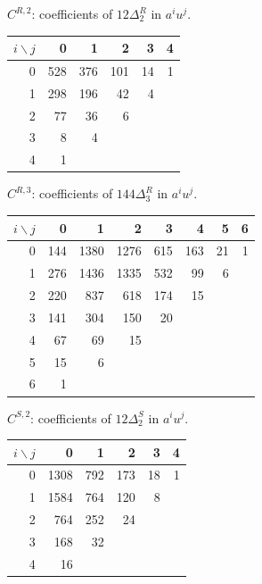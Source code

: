 \begin{center}
\begin{minipage}{\textwidth}
\centering\small
$C^{R,2}$: coefficients of $12\Delta^{R}_{2}$ in $a^i u^j$.\par\smallskip
\setlength{\tabcolsep}{5pt}
\renewcommand{\arraystretch}{1.12}
\begin{tabular}{r|rrrrr}
$i\backslash j$ & 0 & 1 & 2 & 3 & 4 \\
\hline
0 & 528 & 376 & 101 & 14 & 1 \\
1 & 298 & 196 & 42 & 4 &  \\
2 & 77 & 36 & 6 &  &  \\
3 & 8 & 4 &  &  &  \\
4 & 1 &  &  &  &  \\
\end{tabular}
\end{minipage}
\end{center}
\begin{center}
\begin{minipage}{\textwidth}
\centering\small
$C^{R,3}$: coefficients of $144\Delta^{R}_{3}$ in $a^i u^j$.\par\smallskip
\setlength{\tabcolsep}{5pt}
\renewcommand{\arraystretch}{1.12}
\begin{tabular}{r|rrrrrrr}
$i\backslash j$ & 0 & 1 & 2 & 3 & 4 & 5 & 6 \\
\hline
0 & 144 & 1380 & 1276 & 615 & 163 & 21 & 1 \\
1 & 276 & 1436 & 1335 & 532 & 99 & 6 &  \\
2 & 220 & 837 & 618 & 174 & 15 &  &  \\
3 & 141 & 304 & 150 & 20 &  &  &  \\
4 & 67 & 69 & 15 &  &  &  &  \\
5 & 15 & 6 &  &  &  &  &  \\
6 & 1 &  &  &  &  &  &  \\
\end{tabular}
\end{minipage}
\end{center}
\begin{center}
\begin{minipage}{\textwidth}
\centering\small
$C^{S,2}$: coefficients of $12\Delta^{S}_{2}$ in $a^i u^j$.\par\smallskip
\setlength{\tabcolsep}{5pt}
\renewcommand{\arraystretch}{1.12}
\begin{tabular}{r|rrrrr}
$i\backslash j$ & 0 & 1 & 2 & 3 & 4 \\
\hline
0 & 1308 & 792 & 173 & 18 & 1 \\
1 & 1584 & 764 & 120 & 8 &  \\
2 & 764 & 252 & 24 &  &  \\
3 & 168 & 32 &  &  &  \\
4 & 16 &  &  &  &  \\
\end{tabular}
\end{minipage}
\end{center}
